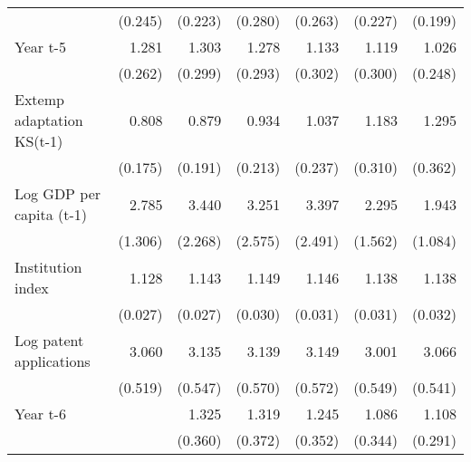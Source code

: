 \begin{table}[htbp]
\begin{tabular}{l*{6}{D{.}{.}{-1}}}
                    &     (0.245)         &     (0.223)         &     (0.280)         &     (0.263)         &     (0.227)         &     (0.199)         \\
\addlinespace
Year t-5            &       1.281         &       1.303         &       1.278         &       1.133         &       1.119         &       1.026         \\
                    &     (0.262)         &     (0.299)         &     (0.293)         &     (0.302)         &     (0.300)         &     (0.248)         \\
\addlinespace
Extemp adaptation KS(t-1)&       0.808         &       0.879         &       0.934         &       1.037         &       1.183         &       1.295         \\
                    &     (0.175)         &     (0.191)         &     (0.213)         &     (0.237)         &     (0.310)         &     (0.362)         \\
\addlinespace
Log GDP per capita (t-1)&       2.785\sym{**} &       3.440\sym{*}  &       3.251\sym{\%}  &       3.397\sym{*}  &       2.295         &       1.943         \\
                    &     (1.306)         &     (2.268)         &     (2.575)         &     (2.491)         &     (1.562)         &     (1.084)         \\
\addlinespace
Institution index   &       1.128\sym{***}&       1.143\sym{***}&       1.149\sym{***}&       1.146\sym{***}&       1.138\sym{***}&       1.138\sym{***}\\
                    &     (0.027)         &     (0.027)         &     (0.030)         &     (0.031)         &     (0.031)         &     (0.032)         \\
\addlinespace
Log patent applications&       3.060\sym{***}&       3.135\sym{***}&       3.139\sym{***}&       3.149\sym{***}&       3.001\sym{***}&       3.066\sym{***}\\
                    &     (0.519)         &     (0.547)         &     (0.570)         &     (0.572)         &     (0.549)         &     (0.541)         \\
\addlinespace
Year t-6            &                     &       1.325         &       1.319         &       1.245         &       1.086         &       1.108         \\
                    &                     &     (0.360)         &     (0.372)         &     (0.352)         &     (0.344)         &     (0.291)         \\

\end{tabular}
\end{table}
